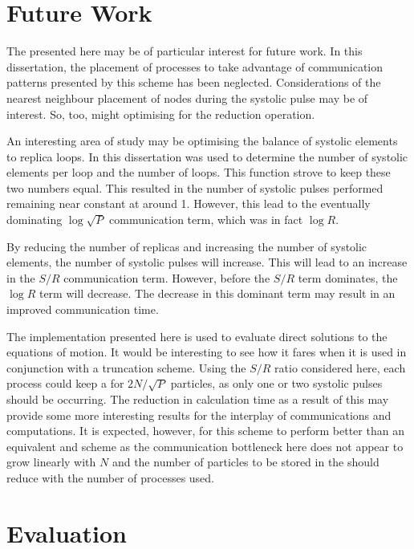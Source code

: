 \section{Future Work}

The \replicatedsystolicloop{} presented here may be of particular
interest for future work.
%
In this dissertation, the placement of processes to take advantage
of communication patterns presented by this scheme has been neglected.
%
Considerations of the nearest neighbour placement of nodes during the
systolic pulse may be of interest.
%
So, too, might optimising for the reduction operation.

An interesting area of study may be optimising the balance of
systolic elements to replica loops.
%
In this dissertation \mpidimscreate{} was used to determine the
number of systolic elements per loop and the number of loops.
%
This function strove to keep these two numbers equal.
%
This resulted in the number of systolic pulses performed remaining
near constant at around 1.
%
However, this lead to the eventually dominating $\log{\sqrt{P}}$
communication term, which was in fact $\log{R}$.

By reducing the number of replicas and increasing the number of
systolic elements, the number of systolic pulses will increase.
%
This will lead to an increase in the $S/R$ communication term.
%
However, before the $S/R$ term dominates, the $\log{R}$ term will
decrease.
%
The decrease in this dominant term may result in an improved
communication time.

The implementation presented here is used to evaluate direct
solutions to the equations of motion.
%
It would be interesting to see how it fares when it is used in
conjunction with a truncation scheme.
%
Using the $S/R$ ratio considered here, each process could
keep a \verletlist{} for $2N/\sqrt{P}$ particles, as only one
or two systolic pulses should be occurring.
%
The reduction in calculation time as a result of this may
provide some more interesting results for the interplay
of communications and computations.
%
It is expected, however, for this scheme to perform better than
an equivalent \replicateddata{} and \verletlist{} scheme as
the communication bottleneck here does not appear to grow linearly
with $N$ and the number of particles to be stored in the \verletlist{}
should reduce with the number of processes used.


\section{Evaluation}

